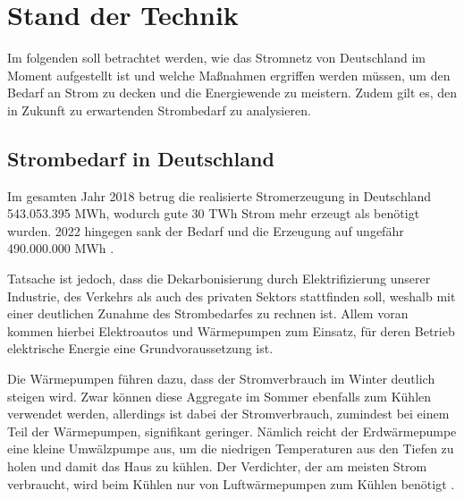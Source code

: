 \documentclass[12pt, a4paper]{article}
\begin{document}

\newpage

\section{Stand der Technik}

Im folgenden soll betrachtet werden, wie das Stromnetz von Deutschland im Moment aufgestellt ist und welche Maßnahmen ergriffen werden müssen, um den Bedarf an Strom zu decken und die Energiewende zu meistern. Zudem gilt es, den in Zukunft zu erwartenden Strombedarf zu analysieren.

\subsection{Strombedarf in Deutschland}
\label{subsec:energy_need}

Im gesamten Jahr 2018 betrug die realisierte Stromerzeugung in Deutschland 543.053.395 MWh, wodurch gute 30 TWh Strom mehr erzeugt als benötigt wurden. 2022 hingegen sank der Bedarf und die Erzeugung auf ungefähr 490.000.000 MWh \cite{ws:smard}.


Tatsache ist jedoch, dass die Dekarbonisierung durch Elektrifizierung unserer Industrie, des Verkehrs als auch des privaten Sektors stattfinden soll, weshalb mit einer deutlichen Zunahme des Strombedarfes zu rechnen ist. Allem voran kommen hierbei Elektroautos und Wärmepumpen zum Einsatz, für deren Betrieb elektrische Energie eine Grundvoraussetzung ist. 

Die Wärmepumpen führen dazu, dass der Stromverbrauch im Winter deutlich steigen wird. Zwar können diese Aggregate im Sommer ebenfalls zum Kühlen verwendet werden, allerdings ist dabei der Stromverbrauch, zumindest bei einem Teil der Wärmepumpen, signifikant geringer. Nämlich reicht der Erdwärmepumpe eine kleine Umwälzpumpe aus, um die niedrigen Temperaturen aus den Tiefen zu holen und damit das Haus zu kühlen. Der Verdichter, der am meisten Strom verbraucht, wird beim Kühlen nur von Luftwärmepumpen zum Kühlen benötigt \cite{faz2023waermepumpe}.
\end{document}
